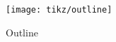 \begin{figure} 
	\centering
	\texttt{[image: tikz/outline]}
	\caption[Outline]{Outline}
	\label{fig:outline}
\end{figure}
